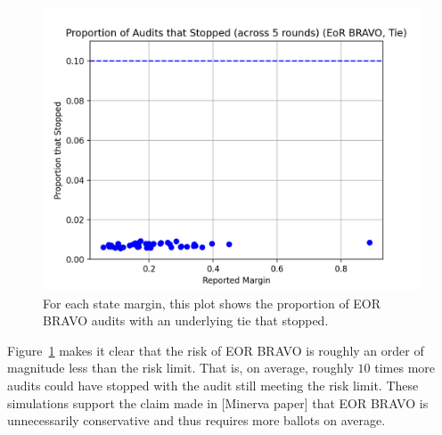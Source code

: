 \documentclass[runningheads]{llncs}
\begin{document}
\begin{figure}
\includegraphics[width=\textwidth]{eor_bravo_90perc_10^4_corrected/total_risk.png}
\caption{For each state margin, this plot shows
the proportion of EOR BRAVO audits with an underlying
tie that stopped.}
\label{fig:eor_bravo_risk}
\end{figure}

Figure~\ref{fig:eor_bravo_risk} makes it clear that the risk of EOR BRAVO is roughly
an order of magnitude less than the risk limit. 
That is, on average, roughly $10$ times more audits could have stopped 
with the audit still meeting the risk limit.
These simulations support the claim made in [Minerva paper]
that EOR BRAVO is unnecessarily conservative and thus requires
more ballots on average.

\end{document}
